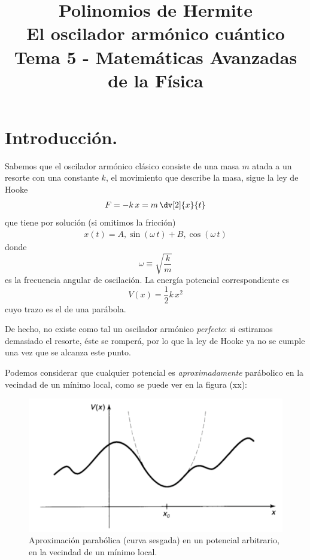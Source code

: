 
\author{}
\title{Polinomios de Hermite \\ \large{El oscilador armónico cuántico}\\ {\large Tema 5 - Matemáticas Avanzadas de la Física}\vspace{-1.5\baselineskip}}
\date{ }

\maketitle
\fontsize{14}{14}\selectfont
\section{Introducción.}
Sabemos que el oscilador armónico clásico consiste de una masa $m$ atada a un resorte con una constante $k$, el movimiento que describe la masa, sigue la ley de Hooke
\begin{align*}
F = - k \, x = m \, \dv[2]{x}{t}
\end{align*}
que tiene por solución (si omitimos la fricción)
\begin{align*}
x(t) = A , \sin (\omega \, t) + B , \cos (\omega \, t)
\end{align*}
donde
\begin{equation}
\omega \equiv \sqrt{\dfrac{k}{m}}
\label{eq:ecuacion_02_036}
\end{equation}
es la frecuencia angular de oscilación. La energía potencial correspondiente es
\begin{equation}
V(x) = \dfrac{1}{2} k \, x^{2}
\label{eq:ecuacion_02_037}
\end{equation}
cuyo trazo es el de una parábola.
\par
De hecho, no existe como tal un oscilador armónico \emph{perfecto}: si estiramos demasiado el resorte, éste se romperá, por lo que la ley de Hooke ya no se cumple una vez que se alcanza este punto.
\par
Podemos considerar que cualquier potencial es \textit{aproximadamente} parábolico en la vecindad de un mínimo local, como se puede ver en la figura (xx):
\begin{figure}[H]
    \centering
    \includegraphics[scale=0.5]{Imagenes/Potencial_arbitrario.png}
    \caption{Aproximación parabólica (curva sesgada) en un potencial arbitrario, en la vecindad de un mínimo local.}
    \label{fig:figura_001}
\end{figure}
